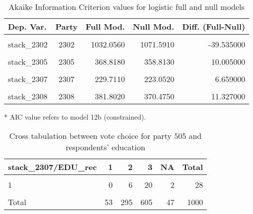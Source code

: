 \documentclass[
]{article}
\begin{document}
\begin{table}[!h]

\caption{\label{tab:unnamed-chunk-151}Akaike Information Criterion values for logistic full and null models 
        \label{table:logit_aic_ro}}
\centering
\begin{threeparttable}
\begin{tabular}[t]{lcrrr}
\toprule
Dep. Var. & Party & Full Mod. & Null Mod. & Diff. (Full-Null)\\
\midrule
\cellcolor{gray!6}{stack\_2301} & \cellcolor{gray!6}{2301} & \cellcolor{gray!6}{580.5250} & \cellcolor{gray!6}{611.9490} & \cellcolor{gray!6}{-31.423000}\\
stack\_2302 & 2302 & 1032.0560 & 1071.5910 & -39.535000\\
\cellcolor{gray!6}{stack\_2303} & \cellcolor{gray!6}{2303} & \cellcolor{gray!6}{371.1440} & \cellcolor{gray!6}{376.2380} & \cellcolor{gray!6}{-5.094000}\\
stack\_2305 & 2305 & 368.8180 & 358.8130 & 10.005000\\
\cellcolor{gray!6}{stack\_2306} & \cellcolor{gray!6}{2306} & \cellcolor{gray!6}{911.0000} & \cellcolor{gray!6}{908.7000} & \cellcolor{gray!6}{2.301000}\\
\addlinespace
stack\_2307 & 2307 & 229.7110 & 223.0520 & 6.659000\\
\cellcolor{gray!6}{stack\_2307*} & \cellcolor{gray!6}{2307} & \cellcolor{gray!6}{230.0202} & \cellcolor{gray!6}{223.0515} & \cellcolor{gray!6}{6.968671}\\
stack\_2308 & 2308 & 381.8020 & 370.4750 & 11.327000\\
\bottomrule
\end{tabular}
\begin{tablenotes}[para]
\item[*] AIC value refers to model 12b (constrained).
\end{tablenotes}
\end{threeparttable}
\end{table}

\begin{table}

\caption{\label{tab:unnamed-chunk-152}Cross tabulation between vote choice for party 505 and respondents' education 
                   \label{table:crosstab_1_ro}}
\centering
\begin{tabular}[t]{l|r|r|r|r|r}
\hline
stack\_2307/EDU\_rec & 1 & 2 & 3 & NA & Total\\
\hline
\cellcolor{gray!6}{0} & \cellcolor{gray!6}{51} & \cellcolor{gray!6}{284} & \cellcolor{gray!6}{566} & \cellcolor{gray!6}{43} & \cellcolor{gray!6}{944}\\
\hline
1 & 0 & 6 & 20 & 2 & 28\\
\hline
\cellcolor{gray!6}{NA} & \cellcolor{gray!6}{2} & \cellcolor{gray!6}{5} & \cellcolor{gray!6}{19} & \cellcolor{gray!6}{2} & \cellcolor{gray!6}{28}\\
\hline
Total & 53 & 295 & 605 & 47 & 1000\\
\hline
\end{tabular}
\end{table}
\end{document}
